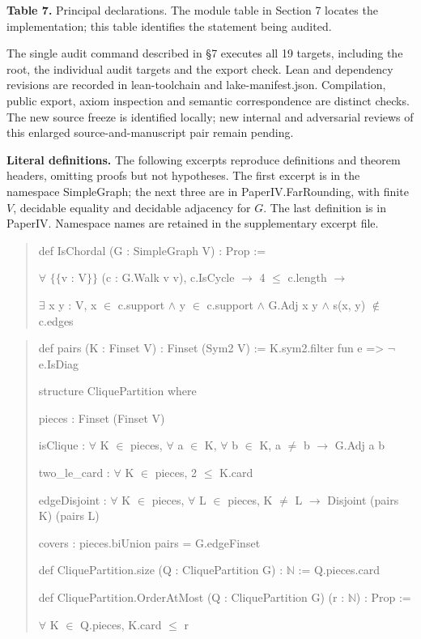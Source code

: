 \documentclass[english,11pt,a4paper]{article}
\begin{document}
\textbf{Table 7.} Principal declarations. The module table in Section 7 locates the implementation; this table identifies the statement being audited.

The single audit command described in §7 executes all 19 targets, including the root, the individual audit targets and the export check. Lean and dependency revisions are recorded in lean-toolchain and lake-manifest.json. Compilation, public export, axiom inspection and semantic correspondence are distinct checks. The new source freeze is identified locally; new internal and adversarial reviews of this enlarged source-and-manuscript pair remain pending.

\textbf{Literal definitions.} The following excerpts reproduce definitions and theorem headers, omitting proofs but not hypotheses. The first excerpt is in the namespace {\ttfamily\small SimpleGraph}; the next three are in {\ttfamily\small PaperIV.\discretionary{\hbox{\ensuremath{\hookrightarrow}}}{}{}FarRounding}, with finite \(V\), decidable equality and decidable adjacency for \(G\). The last definition is in {\ttfamily\small PaperIV}. Namespace names are retained in the supplementary excerpt file.

\begin{quote}\footnotesize\ttfamily\raggedright
def IsChordal (G : SimpleGraph V) : Prop :=\par
  \(\forall\) \(\{\!\{\)v : V\(\}\!\}\) (c : G.Walk v v), c.IsCycle \(\to\) 4 \(\le\) c.length \(\to\)\par
    \(\exists\) x y : V, x \(\in\) c.support \(\land\) y \(\in\) c.support \(\land\) G.Adj x y \(\land\) s(x, y) \(\notin\) c.edges\par
\end{quote}

\begin{quote}\footnotesize\ttfamily\raggedright
def pairs (K : Finset V) : Finset (Sym2 V) := K.sym2.filter fun e => \(\neg\) e.IsDiag\par
\par
structure CliquePartition where\par
  pieces : Finset (Finset V)\par
  isClique : \(\forall\) K \(\in\) pieces, \(\forall\) a \(\in\) K, \(\forall\) b \(\in\) K, a \(\ne\) b \(\to\) G.Adj a b\par
  two\_le\_card : \(\forall\) K \(\in\) pieces, 2 \(\le\) K.card\par
  edgeDisjoint : \(\forall\) K \(\in\) pieces, \(\forall\) L \(\in\) pieces, K \(\ne\) L \(\to\) Disjoint (pairs K) (pairs L)\par
  covers : pieces.biUnion pairs = G.edgeFinset\par
\par
def CliquePartition.size (Q : CliquePartition G) : \(\mathbb N\) := Q.pieces.card\par
\par
def CliquePartition.OrderAtMost (Q : CliquePartition G) (r : \(\mathbb N\)) : Prop :=\par
  \(\forall\) K \(\in\) Q.pieces, K.card \(\le\) r\par
\end{quote}
\end{document}
